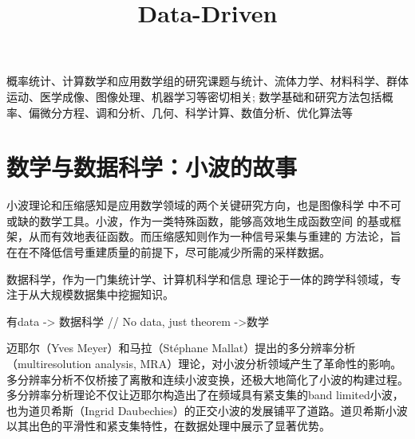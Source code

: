 \documentclass{ctexart}
\title{\textsf{Data-Driven}}
\begin{document}
\setcounter{page}{0}

\maketitle

\vspace{-2ex}\par\hspace{1.5em}
概率统计、计算数学和应用数学组的研究课题与统计、流体力学、材料科学、群体运动、医学成像、图像处理、机器学习等密切相关;
数学基础和研究方法包括概率、偏微分方程、调和分析、几何、科学计算、数值分析、优化算法等

\vspace{2.333ex}
\vspace{-2.333ex}
\clearpage

\tableofcontents

\vspace{-2.333ex}

\clearpage
{}
\setcounter{page}{1}


\section{数学与数据科学：小波的故事}

小波理论和压缩感知是应用数学领域的两个关键研究方向，也是图像科学
中不可或缺的数学工具。小波，作为一类特殊函数，能够高效地生成函数空间
的基或框架，从而有效地表征函数。而压缩感知则作为一种信号采集与重建的
方法论，旨在在不降低信号重建质量的前提下，尽可能减少所需的采样数据。

数据科学，作为一门集统计学、计算机科学和信息 理论于一体的跨学科领域，专注于从大规模数据集中挖掘知识。


{\color{red} 有data -> 数据科学 //
No data, just theorem ->数学 }

迈耶尔（Yves Meyer）和马拉（Stéphane Mallat）提出的多分辨率分析
（multiresolution analysis, MRA）理论，对小波分析领域产生了革命性的影响。
多分辨率分析不仅桥接了离散和连续小波变换，还极大地简化了小波的构建过程。多分辨率分析理论不仅让迈耶尔构造出了在频域具有紧支集的band limited小波，也为道贝希斯（Ingrid Daubechies）的正交小波的发展铺平了道路。道贝希斯小波以其出色的平滑性和紧支集特性，在数据处理中展示了显著优势。
\end{document}
